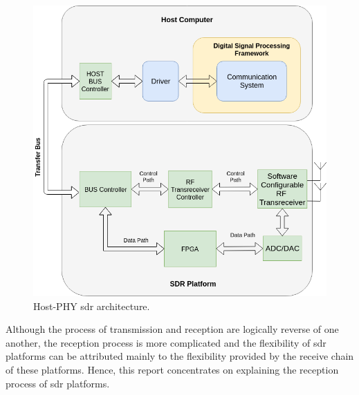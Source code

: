 \begin{figure}[h!]
\centering
\includegraphics[width=\textwidth]{Figure/Host_Phy.png}
\caption{Host-PHY \cite{nychis_enabling_nodate} \ac{sdr} architecture.}
\label{host_PHY}
\end{figure}

Although the process of transmission and reception are logically reverse of one another, the reception process is more complicated and the flexibility of \ac{sdr} platforms can be attributed mainly to the flexibility provided by the receive chain of these platforms.
Hence, this report concentrates on explaining the reception process of \ac{sdr} platforms.

